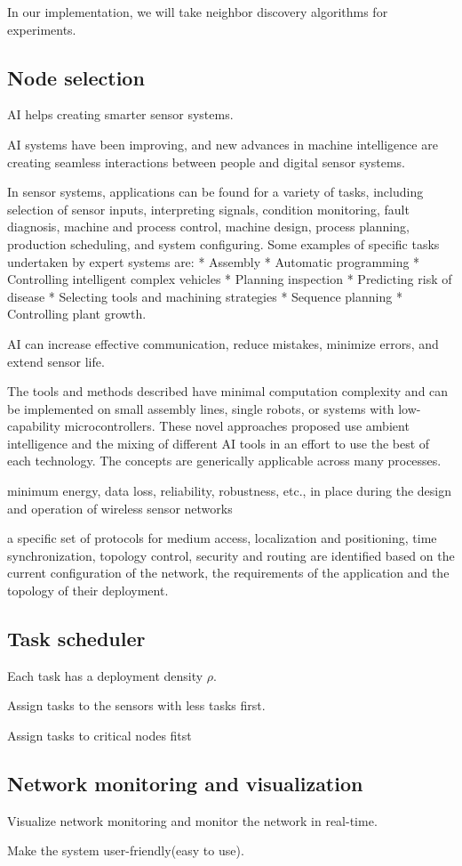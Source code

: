 In our implementation, we will take neighbor discovery algorithms for experiments.
\fi



\subsection{Node selection}

AI helps creating smarter sensor systems.

AI systems have been improving, and new advances in machine intelligence are creating seamless interactions between people and digital sensor systems.

 In sensor systems, applications can be found for a variety of tasks, including selection of sensor inputs, interpreting signals, condition monitoring, fault diagnosis, machine and process control, machine design, process planning, production scheduling, and system configuring. Some examples of specific tasks undertaken by expert systems are:
* Assembly 
* Automatic programming 
* Controlling intelligent complex vehicles  
* Planning inspection 
* Predicting risk of disease 
* Selecting tools and machining strategies 
* Sequence planning 
* Controlling plant growth. 

AI can increase effective communication, reduce mistakes, minimize errors, and extend sensor life.



The tools and methods described have minimal computation complexity and can be implemented on small assembly lines, single robots, or systems with low-capability microcontrollers. These novel approaches proposed use ambient intelligence and the mixing of different AI tools in an effort to use the best of each technology. The concepts are generically applicable across many processes.


minimum energy, data loss, reliability, robustness, etc., in place during the design and operation of wireless sensor networks

a specific set of protocols for medium access, localization and positioning, time synchronization, topology control, security and routing are identified based on the current configuration of the network, the requirements of the application and the topology of their deployment.

\subsection{Task scheduler}

Each task has a deployment density $\rho$.

Assign tasks to the sensors with less tasks first.

Assign tasks to critical nodes fitst

\subsection{Network monitoring and visualization}

Visualize network monitoring and monitor the network in real-time.

Make the system user-friendly(easy to use).
